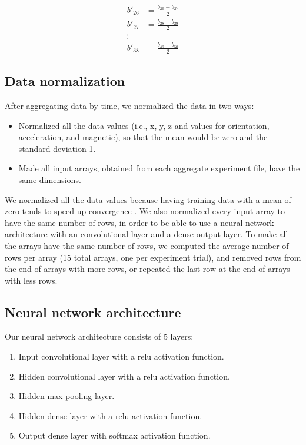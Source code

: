 \documentclass[journal]{IEEEtranTIE}
\begin{document}
\begin{enumerate}
\begin{enumerate}
\begin{align}
    b'_{26} &= \frac{b_{26} + b_{27}}{2} \\
    b'_{27} &= \frac{b_{28} + b_{29}}{2} \\
    \vdots \\
    b'_{38} &= \frac{b_{49} + b_{50}}{2}
\end{align}

\subsection{Data normalization}

After aggregating data by time, we normalized the data in two ways:

\begin{itemize}
\item Normalized all the data values (i.e., x, y, z and values for orientation,
      acceleration, and magnetic), so that the mean would be zero and the
      standard deviation 1.
\item Made all input arrays, obtained from each aggregate experiment file, have
      the same dimensions.
\end{itemize}

We normalized all the data values because having training data with a mean of
zero tends to speed up convergence \cite{DLTricks}. We also normalized every
input array to have the same number of rows, in order to be able to use a neural
network architecture with an convolutional layer and a dense output layer. To
make all the arrays have the same number of rows, we computed the average number
of rows per array (15 total arrays, one per experiment trial), and removed rows
from the end of arrays with more rows, or repeated the last row at the end of
arrays with less rows.

\subsection{Neural network architecture}

Our neural network architecture consists of 5 layers:

\begin{enumerate}
\item Input convolutional layer with a relu activation function.
\item Hidden convolutional layer with a relu activation function.
\item Hidden max pooling layer.
\item Hidden dense layer with a relu activation function.
\item Output dense layer with softmax activation function.
\end{enumerate}


\end{enumerate}
\end{enumerate}
\end{document}

